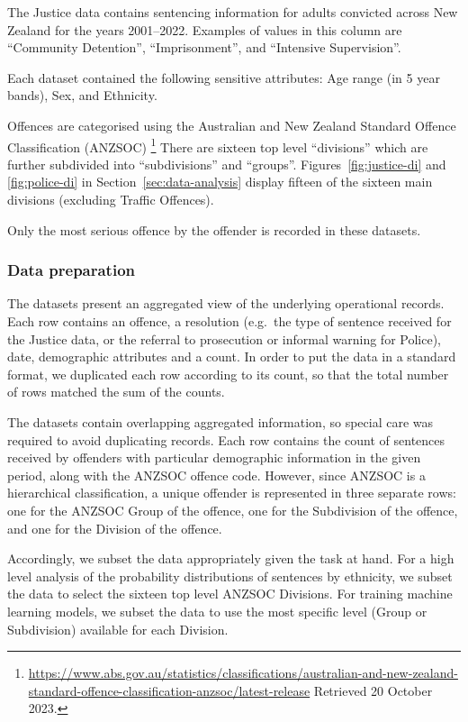 \documentclass[runningheads]{llncs}
\begin{document}
The Justice data contains sentencing information for adults convicted
across New Zealand for the years 2001--2022. Examples of values in
this column are ``Community Detention'', ``Imprisonment'', and
``Intensive Supervision''.

Each dataset contained the following sensitive attributes: Age range
(in 5 year bands), Sex, and Ethnicity.

Offences are categorised using the Australian and New Zealand Standard
Offence Classification (ANZSOC)%
\footnote{\url{https://www.abs.gov.au/statistics/classifications/australian-and-new-zealand-standard-offence-classification-anzsoc/latest-release}
    Retrieved 20 October 2023.} There are sixteen top level
``divisions'' which are further subdivided into ``subdivisions'' and
``groups''. Figures~\ref{fig:justice-di} and \ref{fig:police-di} in
Section~\ref{sec:data-analysis} display fifteen of the sixteen main
divisions (excluding Traffic Offences).

Only the most serious offence by the offender is recorded in these
datasets.

\subsubsection{Data preparation}
The datasets present an aggregated view of the underlying operational
records. Each row contains an offence, a resolution (e.g.\ the type of
sentence received for the Justice data, or the referral to prosecution
or informal warning for Police), date, demographic attributes and a
count. In order to put the data in a standard format, we duplicated
each row according to its count, so that the total number of rows
matched the sum of the counts.

The datasets contain overlapping aggregated information, so special
care was required to avoid duplicating records. Each row contains the
count of sentences received by offenders with particular demographic
information in the given period, along with the ANZSOC offence code.
However, since ANZSOC is a hierarchical classification, a unique
offender is represented in three separate rows: one for the ANZSOC
Group of the offence, one for the Subdivision of the offence, and one
for the Division of the offence.

Accordingly, we subset the data appropriately given the task at hand.
For a high level analysis of the probability distributions of
sentences by ethnicity, we subset the data to select the sixteen top
level ANZSOC Divisions. For training machine learning models, we
subset the data to use the most specific level (Group or Subdivision)
available for each Division.
\end{document}
